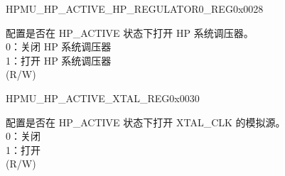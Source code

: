 \begin{register}{H}{PMU\_HP\_ACTIVE\_HP\_REGULATOR0\_REG}{0x0028}\label{regdesc:PMUHPACTIVEHPREGULATOR0REG}
%
%
%
\regnewline%
\begin{regdesc}\begin{reglist}
\label{fielddesc:PMUHPACTIVEHPREGULATORXPD}\item [PMU\_HP\_ACTIVE\_HP\_REGULATOR\_XPD] 配置是否在 HP\_ACTIVE 状态下打开 HP 系统调压器。\\
0：关闭 HP 系统调压器 \\
1：打开 HP 系统调压器\\
(R/W)
\end{reglist}\end{regdesc}
\end{register}


\begin{register}{H}{PMU\_HP\_ACTIVE\_XTAL\_REG}{0x0030}\label{regdesc:PMUHPACTIVEXTALREG}
%
%
\regnewline%
\begin{regdesc}\begin{reglist}
\label{fielddesc:PMUHPACTIVEXPDXTAL}\item [PMU\_HP\_ACTIVE\_XPD\_XTAL] 配置是否在 HP\_ACTIVE 状态下打开 XTAL\_CLK 的模拟源。\\
0：关闭\\
1：打开\\
(R/W)
\end{reglist}\end{regdesc}
\end{register}


